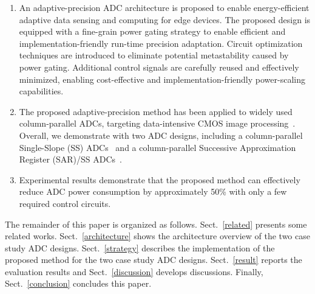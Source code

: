 \begin{enumerate}[\IEEEsetlabelwidth{3)}]
\item 
An adaptive-precision ADC architecture is proposed to enable energy-efficient adaptive data sensing and computing for edge devices. 
The proposed design is equipped with a fine-grain power gating strategy to enable efficient and implementation-friendly run-time precision adaptation.
Circuit optimization techniques are introduced to eliminate potential metastability caused by power gating. 
Additional control signals are carefully reused and effectively minimized, enabling cost-effective and implementation-friendly power-scaling 
capabilities.  
\item 
The proposed adaptive-precision method has been applied to widely used column-parallel ADCs, targeting data-intensive CMOS image 
processing~\cite{kim_11-bit_2021,nie_single_2020,kumagai_14-inch_2018,park_640_2020}. Overall, we demonstrate with two ADC designs, including 
a column-parallel Single-Slope (SS) ADCs~\cite{snoeij_18v_2005,kleinfelder_10000_2001} and a column-parallel Successive Approximation Register (SAR)/SS ADCs~\cite{kim_area-efficient_2016}. 


	\item 
	Experimental results demonstrate that the proposed method can effectively reduce ADC power consumption by approximately 50\% with only a few required control circuits.

\end{enumerate} 

The remainder of this paper is organized as follows. 
Sect.~\ref{related} presents some related works.
Sect.~\ref{architecture} shows the architecture overview of the two case study ADC designs. 
Sect.~\ref{strategy} describes the implementation of the proposed method for the two case study ADC designs. 
Sect.~\ref{result} reports the evaluation results and Sect.~\ref{discussion} develops discussions. 
Finally, Sect.~\ref{conclusion} concludes this paper.
